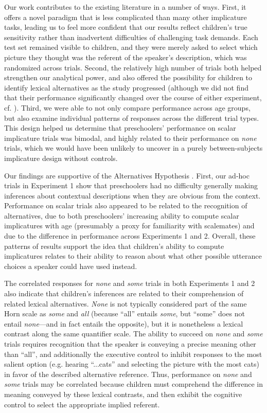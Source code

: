 \documentclass[10pt,letterpaper]{article}
\begin{document}
Our work contributes to the existing literature in a number of ways. First, it offers a novel paradigm that is less complicated than many other implicature tasks, leading us to feel more confident that our results reflect children's true sensitivity rather than inadvertent difficulties of challenging task demands. Each test set remained visible to children, and they were merely asked to select which picture they thought was the referent of the speaker's description, which was randomized across trials. Second, the relatively high number of trials both helped strengthen our analytical power, and also offered the possibility for children to identify lexical alternatives as the study progressed (although we did not find that their performance significantly changed over the course of either experiment, cf. \cite{skordos2014}). Third, we were able to not only compare performance across age groups, but also examine individual patterns of responses across the different trial types. This design helped us determine that preschoolers' performance on scalar implicature trials was bimodal, and highly related to their performance on \emph{none} trials, which we would have been unlikely to uncover in a purely between-subjects implicature design without controls. 

Our findings are supportive of the Alternatives Hypothesis \citep{barner2010,barner2011}. First, our ad-hoc trials in Experiment 1 show that preschoolers had no difficulty generally making inferences about contextual descriptions when they are obvious from the context. Performance on scalar trials also appeared to be related to the recognition of alternatives, due to both preschoolers' increasing ability to compute scalar implicatures with age (presumably a proxy for familiarity with scalemates) and due to the difference in performance across Experiments 1 and 2. Overall, these patterns of results support the idea that children's ability to compute implicatures relates to their ability to reason about what other possible utterance choices a speaker could have used instead.  


The correlated responses for \emph{none} and \emph{some} trials in both Experiments 1 and 2 also indicate that children's inferences are related to their comprehension of related lexical alternatives. \emph{None} is not typically considered part of the same Horn scale as \emph{some} and \emph{all} (because ``all'' entails \emph{some}, but ``some'' does not entail \emph{none}---and in fact entails the opposite), but it is nonetheless a lexical contrast along the same quantifier scale. 
The ability to succeed on \emph{none} and \emph{some} trials requires recognition that the speaker is conveying a precise meaning other than ``all'', and additionally the executive control to inhibit responses to the most salient option (e.g. hearing ``...cats'' and selecting the picture with the most cats) in favor of the described alternative reference.  Thus, performance on \emph{none} and \emph{some} trials may be correlated because children must comprehend the difference in meaning conveyed by these lexical contrasts, and then exhibit the cognitive control to select the appropriate implied referent. 
\end{document}
